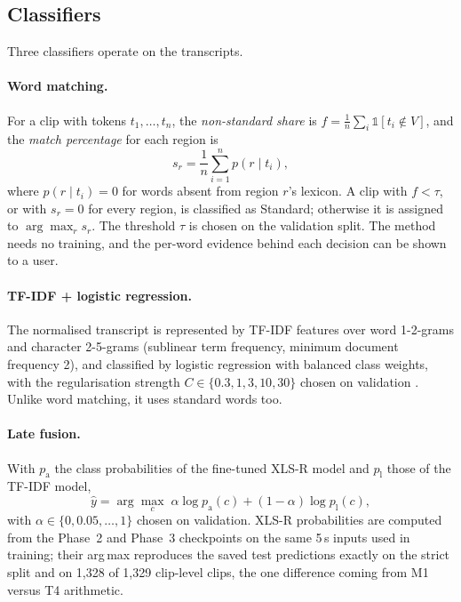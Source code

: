 \subsection{Classifiers}

Three classifiers operate on the transcripts.

\paragraph{Word matching.} For a clip with tokens $t_1, \dots, t_n$, the
\emph{non-standard share} is $f = \frac{1}{n}\sum_i \mathbb{1}[t_i \notin V]$,
and the \emph{match percentage} for each region is
\begin{equation}
  s_r = \frac{1}{n} \sum_{i=1}^{n} p(r \mid t_i),
  \label{eq:match}
\end{equation}
where $p(r \mid t_i) = 0$ for words absent from region $r$'s lexicon. A clip
with $f < \tau$, or with $s_r = 0$ for every region, is classified as Standard;
otherwise it is assigned to $\arg\max_r s_r$. The threshold $\tau$ is chosen on
the validation split. The method needs no training, and the per-word evidence
behind each decision can be shown to a user.

\paragraph{TF-IDF + logistic regression.} The normalised transcript is
represented by TF-IDF features over word 1-2-grams and character 2-5-grams
(sublinear term frequency, minimum document frequency 2), and classified by
logistic regression with balanced class weights, with the regularisation
strength $C \in \{0.3, 1, 3, 10, 30\}$ chosen on validation
\cite{Pedregosa2011Scikit}. Unlike word matching, it uses standard words too.

\paragraph{Late fusion.} With $p_\text{a}$ the class probabilities of the
fine-tuned XLS-R model and $p_\text{l}$ those of the TF-IDF model,
\begin{equation}
  \hat{y} = \arg\max_{c}\; \alpha \log p_\text{a}(c) + (1 - \alpha) \log p_\text{l}(c),
  \label{eq:fusion}
\end{equation}
with $\alpha \in \{0, 0.05, \dots, 1\}$ chosen on validation. XLS-R
probabilities are computed from the Phase~2 and Phase~3 checkpoints on the same
5\,s inputs used in training; their arg\,max reproduces the saved test
predictions exactly on the strict split and on 1,328 of 1,329 clip-level clips,
the one difference coming from M1 versus T4 arithmetic.

